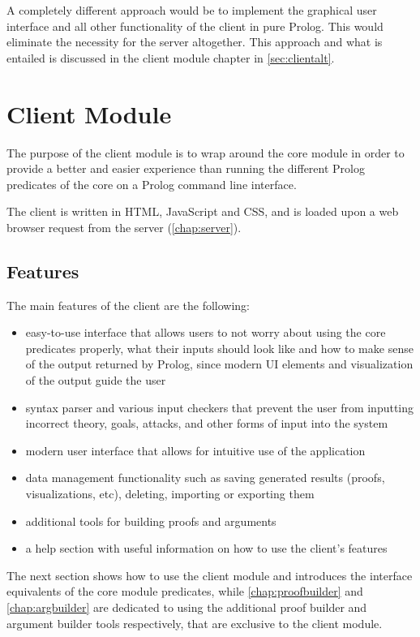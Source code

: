 \documentclass[11pt,twoside,a4paper]{report}
\begin{document}
A completely different approach would be to implement the graphical user interface and all other functionality of the client in pure Prolog. This would eliminate the necessity for the server altogether. This approach and what is entailed is discussed in the client module chapter in \autoref{sec:clientalt}.

\chapter{Client Module}
\label{chap:client}
The purpose of the client module is to wrap around the core module in order to provide a better and easier experience than running the different Prolog predicates of the core on a Prolog command line interface.

The client is written in HTML, JavaScript and CSS, and is loaded upon a web browser request from the server (\autoref{chap:server}).

\section{Features}
The main features of the client are the following:
\begin{itemize}
\item
easy-to-use interface that allows users to not worry about using the core predicates properly, what their inputs should look like and how to make sense of the output returned by Prolog, since modern UI elements and visualization of the output guide the user
\item
syntax parser and various input checkers that prevent the user from inputting incorrect theory, goals, attacks, and other forms of input into the system
\item
modern user interface that allows for intuitive use of the application
\item
data management functionality such as saving generated results (proofs, visualizations, etc), deleting, importing or exporting them
\item
additional tools for building proofs and arguments
\item
a help section with useful information on how to use the client's features
\end{itemize}

The next section shows how to use the client module and introduces the interface equivalents of the core module predicates, while \autoref{chap:proofbuilder} and \autoref{chap:argbuilder} are dedicated to using the additional proof builder and argument builder tools respectively, that are exclusive to the client module.
\end{document}
